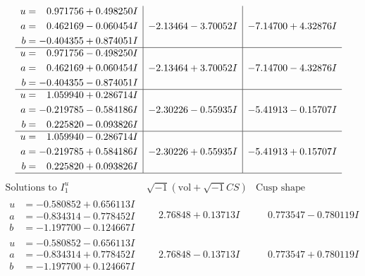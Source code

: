 \documentclass[1p]{elsarticle_modified}
\theoremstyle{definition}
\newcommand{\I}{\sqrt{-1}}
\begin{document}
$$\begin{array}{c|c|c}
\begin{aligned}
u &= \phantom{-}0.971756 + 0.498250 I \\
a &= \phantom{-}0.462169 - 0.060454 I \\
b &= -0.404355 + 0.874051 I\end{aligned}
 & -2.13464 - 3.70052 I & -7.14700 + 4.32876 I \\ \hline\begin{aligned}
u &= \phantom{-}0.971756 - 0.498250 I \\
a &= \phantom{-}0.462169 + 0.060454 I \\
b &= -0.404355 - 0.874051 I\end{aligned}
 & -2.13464 + 3.70052 I & -7.14700 - 4.32876 I \\ \hline\begin{aligned}
u &= \phantom{-}1.059940 + 0.286714 I \\
a &= -0.219785 - 0.584186 I \\
b &= \phantom{-}0.225820 - 0.093826 I\end{aligned}
 & -2.30226 - 0.55935 I & -5.41913 - 0.15707 I \\ \hline\begin{aligned}
u &= \phantom{-}1.059940 - 0.286714 I \\
a &= -0.219785 + 0.584186 I \\
b &= \phantom{-}0.225820 + 0.093826 I\end{aligned}
 & -2.30226 + 0.55935 I & -5.41913 + 0.15707 I\\
 \hline 
 \end{array}$$\newpage$$\begin{array}{c|c|c}  
\text{Solutions to }I^u_{1}& \I (\text{vol} + \sqrt{-1}CS) & \text{Cusp shape}\\
 \hline 
\begin{aligned}
u &= -0.580852 + 0.656113 I \\
a &= -0.834314 - 0.778452 I \\
b &= -1.197700 - 0.124667 I\end{aligned}
 & \phantom{-}2.76848 + 0.13713 I & \phantom{-}0.773547 - 0.780119 I \\ \hline\begin{aligned}
u &= -0.580852 - 0.656113 I \\
a &= -0.834314 + 0.778452 I \\
b &= -1.197700 + 0.124667 I\end{aligned}
 & \phantom{-}2.76848 - 0.13713 I & \phantom{-}0.773547 + 0.780119 I \\ \hline\begin{aligned}

\end{aligned}
\end{array}$$
\end{document}
